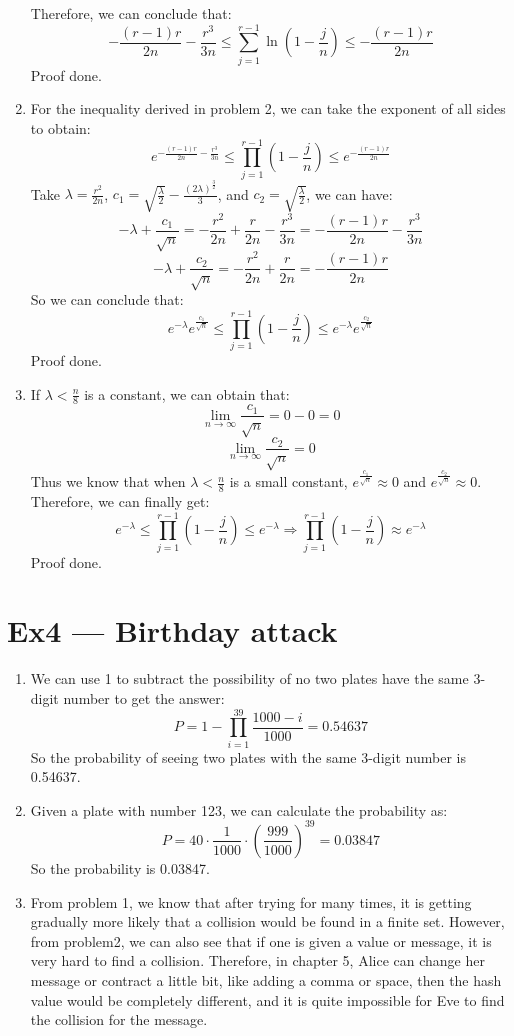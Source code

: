 \documentclass[12pt, a4paper]{article}
\begin{document}
\begin{enumerate}
          Therefore, we can conclude that:
          $$-\frac{(r-1)r}{2n} - \frac{r^3}{3n} \leq \sum_{j=1}^{r-1} \ln(1-\frac{j}{n}) \leq -\frac{(r-1)r}{2n}$$
          Proof done.
    \item For the inequality derived in problem 2, we can take the exponent of all sides to obtain:
          $$e^{-\frac{(r-1)r}{2n} - \frac{r^3}{3n}} \leq \prod_{j=1}^{r-1}(1 - \frac{j}{n}) \leq e^{-\frac{(r-1)r}{2n}}$$
          Take $\lambda = \frac{r^2}{2n}$, $c_1 = \sqrt{\frac{\lambda}{2}} - \frac{(2\lambda)^{\frac{3}{2}}}{3}$, 
          and $c_2 = \sqrt{\frac{\lambda}{2}}$, we can have:
          $$-\lambda + \frac{c_1}{\sqrt{n}} = -\frac{r^2}{2n} + \frac{r}{2n} - \frac{r^3}{3n} = -\frac{(r-1)r}{2n} - \frac{r^3}{3n}$$
          $$-\lambda + \frac{c_2}{\sqrt{n}} = -\frac{r^2}{2n} + \frac{r}{2n} = -\frac{(r-1)r}{2n}$$
          So we can conclude that:
          $$e^{-\lambda}e^{\frac{c_1}{\sqrt{n}}} \leq \prod_{j=1}^{r-1} (1-\frac{j}{n}) \leq e^{-\lambda}e^{\frac{c_2}{\sqrt{n}}}$$
          Proof done.
    \item If $\lambda < \frac{n}{8}$ is a constant, we can obtain that:
          $$\lim_{n\to\infty} \frac{c_1}{\sqrt{n}} = 0 - 0 = 0$$
          $$\lim_{n\to\infty} \frac{c_2}{\sqrt{n}} = 0$$
          Thus we know that when $\lambda < \frac{n}{8}$ is a small constant, 
          $e^{\frac{c_1}{\sqrt{n}}} \approx 0$ and $e^{\frac{c_2}{\sqrt{n}}} \approx 0$. 
          Therefore, we can finally get:
          $$e^{-\lambda} \leq \prod_{j=1}^{r-1} (1 - \frac{j}{n}) \leq e^{-\lambda} 
          \Rightarrow \prod_{j=1}^{r-1} (1 - \frac{j}{n}) \approx e^{-\lambda}$$
          Proof done.

\end{enumerate}

\section*{Ex4 --- Birthday attack}
\begin{enumerate}
    \item We can use 1 to subtract the possibility of no two plates have the same 3-digit number to get the answer:
          $$P = 1 - \prod_{i=1}^{39} \frac{1000 -i}{1000} = 0.54637$$
          So the probability of seeing two plates with the same 3-digit number is 0.54637.
    \item Given a plate with number 123, we can calculate the probability as:
          $$P = 40\cdot \frac{1}{1000}\cdot (\frac{999}{1000})^{39} = 0.03847$$
          So the probability is 0.03847.
    \item From problem 1, we know that after trying for many times, 
          it is getting gradually more likely that a collision would be found in a finite set. However, 
          from problem2, we can also see that if one is given a value or message, 
          it is very hard to find a collision. Therefore, in chapter 5, 
          Alice can change her message or contract a little bit, like adding a comma or space, 
          then the hash value would be completely different, and it is quite impossible for Eve to find the collision for the message.
    
\end{enumerate}
\end{document}
